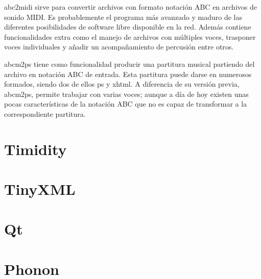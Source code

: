 abc2midi sirve para convertir archivos con formato notación ABC en archivos de sonido MIDI. Es probablemente el programa más avanzado y maduro de las diferentes posibilidades de software libre disponible en la red. Además contiene funcionalidades extra como el manejo de archivos con múltiples voces, trasponer voces individuales y añadir un acompañamiento de percusión entre otros.

abcm2ps tiene como funcionalidad producir una partitura musical partiendo del archivo en notación ABC de entrada. Esta partitura puede darse en numerosos formados, siendo dos de ellos ps y xhtml. A diferencia de su versión previa, abcm2ps, permite trabajar con varias voces; aunque a día de hoy existen unas pocas características de la notación ABC que no es capaz de transformar a la correspondiente partitura.

\section{Timidity}
\label{sec:Timidity}

\section{TinyXML}
\label{sec:TinyXML}

\section{Qt}
\label{sec:Qt}

\section{Phonon}
\label{sec:Phonon}